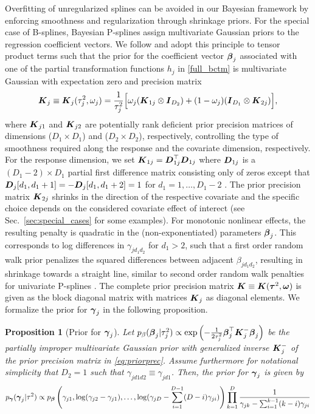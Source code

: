 \documentclass[12pt]{article}
\theoremstyle{plain}
\newtheorem{proposition}[theorem]{Proposition}
\begin{document}
Overfitting of unregularized splines can be avoided in our Bayesian framework by enforcing smoothness and regularization through shrinkage priors. For the special case of B-splines, Bayesian P-splines assign multivariate Gaussian priors to the regression coefficient vectors. We follow \citet{kneib2019modular} and adopt this principle to tensor product terms such that the prior for the coefficient vector $\text{\boldmath$\beta$}_j$ associated with one of the partial transformation functions $h_j$ in \eqref{full_bctm} is multivariate Gaussian with expectation zero and precision matrix
\begin{align}\label{eq:priorprec}
\text{\boldmath$K$}_j\equiv\text{\boldmath$K$}_{j}(\tau^2_j,\omega_j) =\frac{1}{\tau_{j}^2}\Bigl\lbrack \omega_j(\text{\boldmath$K$}_{1j}\otimes\text{\boldmath$I$}_{D_2}) + (1-\omega_j)  (\text{\boldmath$I$}_{D_1}\otimes\text{\boldmath$K$}_{2j})\Bigr\rbrack,
\end{align}
where $\text{\boldmath$K$}_{j1}$ and $\text{\boldmath$K$}_{j2}$ are potentially rank deficient prior precision matrices of dimensions ($D_1\times D_1$) and ($D_2\times D_2$), respectively, controlling the type of smoothness required along the response and the covariate dimension, respectively. For the response dimension, we set $\text{\boldmath$K$}_{1j} = \text{\boldmath$D$}_{1j}^\top \text{\boldmath$D$}_{1j}$ where $\text{\boldmath$D$}_{1j}$ is a $(D_1-2) \times D_1$ partial first difference matrix consisting only of zeros except that $\text{\boldmath$D$}_{j}[d_1,d_1+1] = - \text{\boldmath$D$}_{j}[d_1,d_1+2]=1$ for $d_1=1,\ldots, D_1-2$ \citep{pyawood,pya2010additive}.  The prior precision matrix $\text{\boldmath$K$}_{2j}$ shrinks in the direction of the respective covariate and the specific choice depends on the considered covariate effect of interect (see Sec.~\ref{sec:special_cases} for some examples). For monotonic nonlinear effects, the resulting penalty is quadratic in the (non-exponentiated) parameters $\text{\boldmath$\beta$}_j$. This corresponds to log differences in $\gamma_{jd_1d_2}$ for $d_1>2$, such that a first order random walk prior penalizes the squared differences between adjacent $\beta_{jd_1 d_2}$, resulting in shrinkage towards a straight line, similar to second order random walk penalties for univariate P-splines \citep{pyawood}.  The complete prior precision matrix $\text{\boldmath$K$}\equiv\text{\boldmath$K$}(\text{\boldmath$\tau$}^2,\text{\boldmath$\omega$})$ is given as the block diagonal matrix with matrices $\text{\boldmath$K$}_{j}$ as diagonal elements. We formalize the prior for $\text{\boldmath$\gamma$}_j$ in the following proposition.
\begin{proposition}[Prior for $\text{\boldmath$\gamma$}_{j}$]
Let $p_\beta(\text{\boldmath$\beta$}_j|\tau_j^2)\propto\exp\left(-\tfrac{1}{2\tau_j^2}\text{\boldmath$\beta$}_j^\top\text{\boldmath$K$}_j^{-}\text{\boldmath$\beta$}_j\right)$ be the partially improper multivariate Gaussian prior with generalized inverse $\text{\boldmath$K$}_j^{-}$ of the prior precision matrix in \eqref{eq:priorprec}. Assume furthermore for notational simplicity that $D_2=1$ such that $\gamma_{jd1d2}\equiv\gamma_{jd1}$. Then, the prior for $\text{\boldmath$\gamma$}_j$ is given by
\[
p_{\text{\boldmath$\gamma$}}(\text{\boldmath$\gamma$}_j|\tau^2)\propto p_{\text{\boldmath$\beta$}}\left(\gamma_{j1},\log(\gamma_{j2}-\gamma_{j1}),\ldots,\log(\gamma_{jD}-\sum_{i=1}^{D-1}(D-i)\gamma_{ji})\right)\prod_{k=1}^D\frac{1}{\gamma_{jk}-\sum_{i=1}^{k-1}(k-i)\gamma_{ji}}
\]
\end{proposition}
\end{document}
